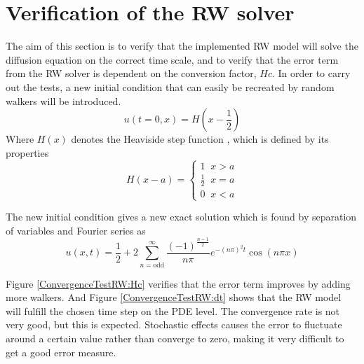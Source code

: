 \section{Verification of the RW solver}

The aim of this section is to verify that the implemented RW model will solve the diffusion equation on the correct time scale, and to verify that the error term from the RW solver is dependent on the conversion factor, $Hc$. 
In order to carry out the tests, a new initial condition that can easily be recreated by random walkers will be introduced.
\begin{equation}
 u(t=0,x) = H\left(x-\frac{1}{2}\right)
\end{equation}
\noindent Where $H(x)$ denotes the Heaviside step function \cite{abramowitz2012handbook}, which is defined by its properties
\begin{equation}\label{Heaviside_def}
 H(x-a) = \begin{cases}
           1\;\;x > a\\
           \frac{1}{2}\;\; x = a\\ 
           0\;\;x < a
          \end{cases}
\end{equation}

\noindent The new initial condition gives a new exact solution which is found by separation of variables and Fourier series as 
\begin{equation}
 u(x,t) = \frac{1}{2} + 2\sum\limits_{n= \text{odd}}^\infty \frac{(-1)^{\frac{n-1}{2}}}{n\pi}e^{-(n\pi)^2t}\cos(n\pi x)
\end{equation}

\noindent Figure \ref{ConvergenceTestRW:Hc} verifies that the error term improves by adding more walkers. And Figure \ref{ConvergenceTestRW:dt} shows that the RW model will fulfill the chosen time step on the PDE level. 
The convergence rate is not very good, but this is expected. 
Stochastic effects causes the error to fluctuate around a certain value rather than converge to zero, making it very difficult to get a good error measure.

